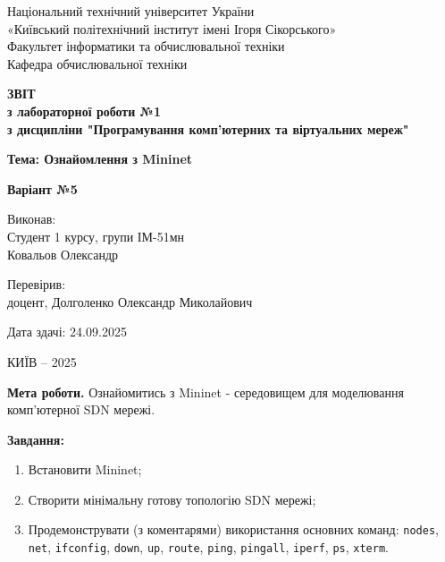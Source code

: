 \documentclass[14pt, a4paper]{extreport}
\newcommand{\CourseTitle}{Програмування комп'ютерних та віртуальних мереж}
\newcommand{\Variant}{5}
\newcommand{\StudentGroup}{ІМ-51мн}
\newcommand{\CourseNumber}{1}
\newcommand{\StudentName}{Ковальов Олександр}
\newcommand{\Teacher}{доцент, Долголенко Олександр Миколайович}
\newcommand{\Year}{2025}
\newcommand{\LabNumber}{1}
\newcommand{\Topic}{Ознайомлення з Mininet}
\newcommand{\SubmissionDate}{24.09.2025}
\begin{document}
	
	\begin{titlepage}
		\begin{center}
			{Національний технічний університет України\\
				«Київський політехнічний інститут імені Ігоря Сікорського» \\[1.0em] }
			{Факультет інформатики та обчислювальної техніки\\}
			{Кафедра обчислювальної техніки \\[5.0em]}
			
			{\textbf{ЗВІТ}\\[1em]}
			{\textbf{з лабораторної роботи №\LabNumber} \\}
			{\textbf{з дисципліни "\CourseTitle"} \\[2.0em]}
			
			{\textbf{Тема: \Topic} \\[2.0em]}
			
			{\textbf{Варіант №\Variant} \\[5.0em]}
			
			\begin{flushright}
				Виконав: \\
				Студент \CourseNumber{} курсу, групи \StudentGroup \\
				\StudentName \\[2.0em]
			\end{flushright}
			
			\begin{flushright}
				Перевірив: \\
				\Teacher \\[2.0em]
			\end{flushright}
			
			\begin{flushright}
				Дата здачі: \SubmissionDate \\[5.0em]
			\end{flushright}
		
			\vfill
			КИЇВ -- \Year
		\end{center}
	\end{titlepage}
	
	\setlength{\parindent}{1.25cm}
	
	\textbf{Мета роботи.} Ознайомитись з Mininet - середовищем для моделювання комп'ютерної SDN мережі.
	
	\textbf{Завдання:}
	\begin{enumerate}
		\item Встановити Mininet;
		\item Створити мінімальну готову топологію SDN мережі;
		\item Продемонструвати (з коментарями) використання основних команд: \texttt{nodes}, \texttt{net}, \texttt{ifconfig}, \texttt{down}, \texttt{up}, \texttt{route}, \texttt{ping}, \texttt{pingall}, \texttt{iperf}, \texttt{ps}, \texttt{xterm}.
	\end{enumerate}
	
\end{document}
